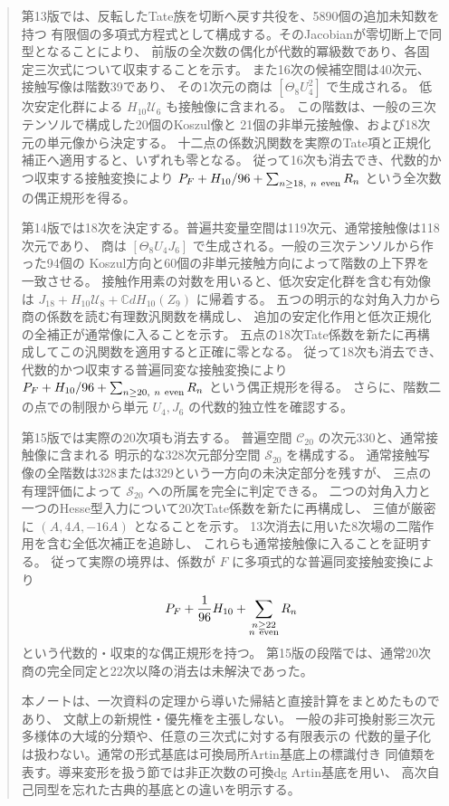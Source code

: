\documentclass[a4paper,11pt]{ltjsarticle}
\theoremstyle{definition}
\newcommand{\CC}{\mathbb C}
\begin{document}
\begin{abstract}
第13版では、反転したTate族を切断へ戻す共役を、5890個の追加未知数を持つ
有限個の多項式方程式として構成する。そのJacobianが零切断上で同型となることにより、
前版の全次数の偶化が代数的冪級数であり、各固定三次式について収束することを示す。
また16次の候補空間は40次元、接触写像は階数39であり、
その1次元の商は $[\Theta_8U_4^2]$ で生成される。
低次安定化群による $H_{10}\mathcal U_6$ も接触像に含まれる。
この階数は、一般の三次テンソルで構成した20個のKoszul像と
21個の非単元接触像、および18次元の単元像から決定する。
十二点の係数汎関数を実際のTate項と正規化補正へ適用すると、いずれも零となる。
従って16次も消去でき、代数的かつ収束する接触変換により
$P_F+H_{10}/96+\sum_{n\ge18,\ n\ {\rm even}}R_n$ という全次数の偶正規形を得る。

第14版では18次を決定する。普遍共変量空間は119次元、通常接触像は118次元であり、
商は $[\Theta_8U_4J_6]$ で生成される。一般の三次テンソルから作った94個の
Koszul方向と60個の非単元接触方向によって階数の上下界を一致させる。
接触作用素の対数を用いると、低次安定化群を含む有効像は
$J_{18}+H_{10}\mathcal U_8+\CC dH_{10}(Z_9)$ に帰着する。
五つの明示的な対角入力から商の係数を読む有理数汎関数を構成し、
追加の安定化作用と低次正規化の全補正が通常像に入ることを示す。
五点の18次Tate係数を新たに再構成してこの汎関数を適用すると正確に零となる。
従って18次も消去でき、代数的かつ収束する普遍同変な接触変換により
$P_F+H_{10}/96+\sum_{n\ge20,\ n\ {\rm even}}R_n$ という偶正規形を得る。
さらに、階数二の点での制限から単元 $U_4,J_6$ の代数的独立性を確認する。


第15版では実際の20次項も消去する。
普遍空間 $\mathcal C_{20}$ の次元330と、通常接触像に含まれる
明示的な328次元部分空間 $\mathcal S_{20}$ を構成する。
通常接触写像の全階数は328または329という一方向の未決定部分を残すが、
三点の有理評価によって $\mathcal S_{20}$ への所属を完全に判定できる。
二つの対角入力と一つのHesse型入力について20次Tate係数を新たに再構成し、
三値が厳密に $(A,4A,-16A)$ となることを示す。
13次消去に用いた8次場の二階作用を含む全低次補正を追跡し、
これらも通常接触像に入ることを証明する。
従って実際の境界は、係数が $F$ に多項式的な普遍同変接触変換により
\[
 P_F+\frac1{96}H_{10}+\sum_{\substack{n\ge22\\n\ {\rm even}}}R_n
\]
という代数的・収束的な偶正規形を持つ。
第15版の段階では、通常20次商の完全同定と22次以降の消去は未解決であった。


本ノートは、一次資料の定理から導いた帰結と直接計算をまとめたものであり、
文献上の新規性・優先権を主張しない。
一般の非可換射影三次元多様体の大域的分類や、任意の三次式に対する有限表示の
代数的量子化は扱わない。通常の形式基底は可換局所Artin基底上の標識付き
同値類を表す。導来変形を扱う節では非正次数の可換dg Artin基底を用い、
高次自己同型を忘れた古典的基底との違いを明示する。
\end{abstract}
\end{document}
